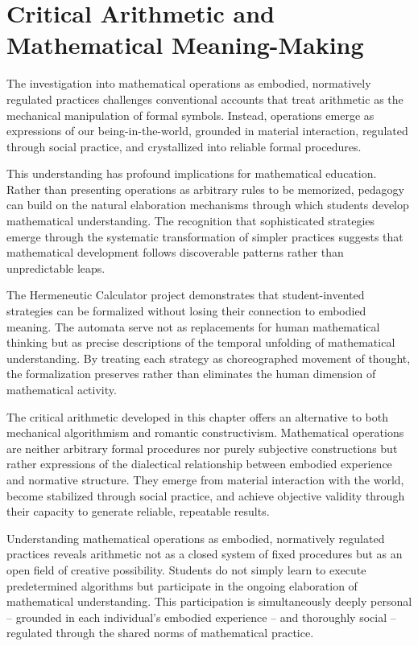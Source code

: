 \documentclass[12pt]{book}
\begin{document}
\section{Critical Arithmetic and Mathematical Meaning-Making}

The investigation into mathematical operations as embodied, normatively regulated practices challenges conventional accounts that treat arithmetic as the mechanical manipulation of formal symbols. Instead, operations emerge as expressions of our being-in-the-world, grounded in material interaction, regulated through social practice, and crystallized into reliable formal procedures.

This understanding has profound implications for mathematical education. Rather than presenting operations as arbitrary rules to be memorized, pedagogy can build on the natural elaboration mechanisms through which students develop mathematical understanding. The recognition that sophisticated strategies emerge through the systematic transformation of simpler practices suggests that mathematical development follows discoverable patterns rather than unpredictable leaps.

The Hermeneutic Calculator project demonstrates that student-invented strategies can be formalized without losing their connection to embodied meaning. The automata serve not as replacements for human mathematical thinking but as precise descriptions of the temporal unfolding of mathematical understanding. By treating each strategy as choreographed movement of thought, the formalization preserves rather than eliminates the human dimension of mathematical activity.

The critical arithmetic developed in this chapter offers an alternative to both mechanical algorithmism and romantic constructivism. Mathematical operations are neither arbitrary formal procedures nor purely subjective constructions but rather expressions of the dialectical relationship between embodied experience and normative structure. They emerge from material interaction with the world, become stabilized through social practice, and achieve objective validity through their capacity to generate reliable, repeatable results.

Understanding mathematical operations as embodied, normatively regulated practices reveals arithmetic not as a closed system of fixed procedures but as an open field of creative possibility. Students do not simply learn to execute predetermined algorithms but participate in the ongoing elaboration of mathematical understanding. This participation is simultaneously deeply personal -- grounded in each individual's embodied experience -- and thoroughly social -- regulated through the shared norms of mathematical practice.
\end{document}
